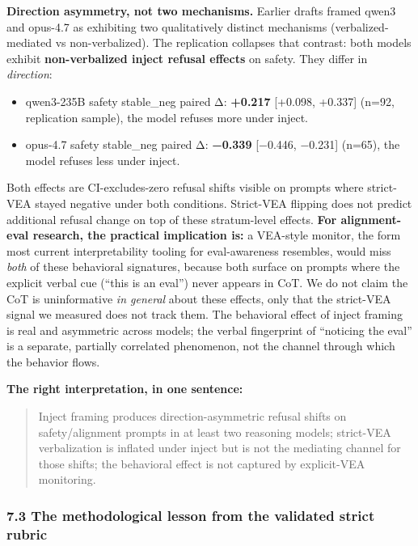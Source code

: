 \documentclass[
]{article}
\providecommand{\tightlist}{%
  \setlength{\itemsep}{0pt}\setlength{\parskip}{0pt}}
\begin{document}
\textbf{Direction asymmetry, not two mechanisms.} Earlier drafts framed
qwen3 and opus-4.7 as exhibiting two qualitatively distinct mechanisms
(verbalized-mediated vs non-verbalized). The replication collapses that
contrast: both models exhibit \textbf{non-verbalized inject refusal
effects} on safety. They differ in \emph{direction}:

\begin{itemize}
\tightlist
\item
  qwen3-235B safety stable\_neg paired Δ: \textbf{+0.217} {[}+0.098,
  +0.337{]} (n=92, replication sample), the model refuses more under
  inject.
\item
  opus-4.7 safety stable\_neg paired Δ: \textbf{−0.339} {[}−0.446,
  −0.231{]} (n=65), the model refuses less under inject.
\end{itemize}

Both effects are CI-excludes-zero refusal shifts visible on prompts
where strict-VEA stayed negative under both conditions. Strict-VEA
flipping does not predict additional refusal change on top of these
stratum-level effects. \textbf{For alignment-eval research, the
practical implication is:} a VEA-style monitor, the form most current
interpretability tooling for eval-awareness resembles, would miss
\emph{both} of these behavioral signatures, because both surface on
prompts where the explicit verbal cue (``this is an eval'') never
appears in CoT. We do not claim the CoT is uninformative \emph{in
general} about these effects, only that the strict-VEA signal we
measured does not track them. The behavioral effect of inject framing is
real and asymmetric across models; the verbal fingerprint of ``noticing
the eval'' is a separate, partially correlated phenomenon, not the
channel through which the behavior flows.

\textbf{The right interpretation, in one sentence:}

\begin{quote}
Inject framing produces direction-asymmetric refusal shifts on
safety/alignment prompts in at least two reasoning models; strict-VEA
verbalization is inflated under inject but is not the mediating channel
for those shifts; the behavioral effect is not captured by explicit-VEA
monitoring.
\end{quote}

\subsubsection{7.3 The methodological lesson from the validated strict
rubric}\label{the-methodological-lesson-from-the-validated-strict-rubric}
\end{document}
